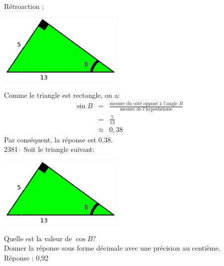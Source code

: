 \documentclass[letterpaper, 12pt]{article}
\begin{document}
R\'etroaction :\\
\begin{center}
 \includegraphics[width=6cm,bb=14 14 415 315]{Q2380.eps}
\end{center}
Comme le triangle est rectangle, on a:
\begin{eqnarray*}
 \sin{B}&=&\frac{\textrm{mesure du c\^ot\'e oppos\'e \`a l'angle $B$}}{\textrm{mesure de l'hypoth\'enuse}}\\
&=&\frac{5}{13}\\[2mm]
&\approx&0,38
\end{eqnarray*}
Par cons\'equent, la r\'eponse est 0,38.\\

2381-- Soit le triangle suivant:
\begin{center}
 \includegraphics[width=6cm,bb=14 14 415 315]{Q2380.eps}
\end{center}
Quelle est la valeur de $\cos{B}$?\\
Donner la r\'eponse sous forme d\'ecimale avec une pr\'ecision au centi\`eme.\\

R\'eponse : 0,92\\
\end{document}
